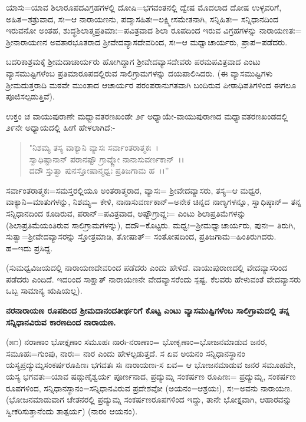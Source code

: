 ಯಾಸು=ಯಾವ ಶಿಲಾರೂಪದವಿಗ್ರಹಗಳಲ್ಲಿ ದೋಷಿ=ಭಗವಂತನಲ್ಲಿ ದ್ವೇಷ ಮೊದಲಾದ ದೋಷ ಉಳ್ಳವರಿಗೆ, ಅಹಿತ=ಶತ್ರುವಾದ, ಸಃ=ಆ ನಾರಾಯಣನು, ಪದ್ಮಾಸಹಿತಃ=ಲಕ್ಷ್ಮೀಸಮೇತನಾಗಿ, ಸನ್ನಿಹಿತಃ= ಸನ್ನಿಧಾನದಿಂದ ಇರುವನೋ ಅಂತಹ, ಶುದ್ಧಶಿಲಾತ್ಮಪ್ರತಿಮಾಃ=ಪವಿತ್ರವಾದ ಶಿಲಾ ರೂಪದಿಂದ ಇರುವ ವಿಗ್ರಹಗಳನ್ನು ನಾರಾಯಣತಃ= ಶ‍್ರೀನಾರಾಯಣನ ಅವತಾರಭೂತರಾದ ಶ‍್ರೀವೇದವ್ಯಾಸದೇವರಿಂದ, ಸಃ=ಆ ಮಧ್ವಾಚಾರ್ಯರು, ಪ್ರಾಪ=ಪಡೆದರು.

ಬದರಿಕಾಶ್ರಮಕ್ಕೆ ಶ‍್ರೀಮದಾಚಾರ್ಯರು ಹೋಗಿದ್ದಾಗ ಶ‍್ರೀವೇದವ್ಯಾಸದೇವರು ಪರಮಪವಿತ್ರವಾದ ಎಂಟು ವ್ಯಾಸಮುಷ್ಟಿಗಳೆಂಬ ಪ್ರತಿಮಾರೂಪದಲ್ಲಿರುವ ಸಾಲಿಗ್ರಾಮಗಳನ್ನು ದಯಪಾಲಿಸಿದರು. (ಈ ವ್ಯಾಸಮುಷ್ಟಿಗಳು ಶ‍್ರೀಮದುತ್ತರಾದಿ ಮಠವೇ ಮುಂತಾದ ಆಚಾರ್ಯರ ಪರಂಪರಾನುಗತವಾಗಿ ಬಂದಿರುವ ಪೀಠಾಧಿಪತಿಗಳಿಂದ ಈಗಲೂ ಪೂಜಿಸಲ್ಪಡುತ್ತಿವೆ).

ಉಕ್ತಂ ಚ ವಾಯುಪುರಾಣೇ ಮಧ್ವಾವತರಣಖಂಡೇ ೨೯ ಅಧ್ಯಾಯೇ-ವಾಯುಪುರಾಣದ ಮಧ್ಯಾವತರಣಖಂಡದಲ್ಲಿ ೨೯ನೇ ಅಧ್ಯಾಯದಲ್ಲಿ ಹೀಗೆ ಹೇಳಲಾಗಿದೆ:-

\begin{verse}
"ನಿಶಮ್ಯ ತಸ್ಯ ವಾಕ್ಯಾನಿ ವ್ಯಾಸಃ ಸರ್ವಾಂತರಾತ್ಮಕಃ~।\\ ಸ್ವಾಧಿಷ್ಟಾನಾನ್ ಪರಾನಷ್ಟೌ ಗ್ರಾವ್ಣೋ ನಾನಾಸುವರ್ಣಕಾನ್~।।\\ ದದೌ ಸ್ತುತ್ವಾ ಪುನಸ್ತೋಷಾನ್ಮಧ್ವಃ ಪ್ರತಿಜಗಾಮ ಹ~।।”
\end{verse}

ಸರ್ವಾಂತರಾತ್ಮಕಃ=ಸಮಸ್ತರಲ್ಲಿಯೂ ಅಂತರಾತ್ಮರಾದ, ವ್ಯಾಸಃ= ಶ‍್ರೀವೇದವ್ಯಾಸರು, ತಸ್ಯ=ಆ ಮಧ್ವರ, ವಾಕ್ಯಾನಿ=ಮಾತುಗಳನ್ನು, ನಿಶಮ್ಯ= ಕೇಳಿ, ನಾನಾಸುವರ್ಣಕಾನ್=ಅನೇಕ ಚಿನ್ನದ ನಾಣ್ಯಗಳನ್ನೂ, ಸ್ವಾಧಿಷ್ಠಾನ್= ತನ್ನ ಸನ್ನಿಧಾನದಿಂದ ಕೂಡಿರುವ, ಪರಾನ್=ಪವಿತ್ರವಾದ, ಅಷ್ಟೌಗ್ರಾವ್ಣಃ= ಎಂಟು ಶಿಲಾಪ್ರತಿಮೆಗಳನ್ನು (ಶಿಲಾಪ್ರತಿಮೆಯಂತಿರುವ ಸಾಲಿಗ್ರಾಮಗಳನ್ನು), ದದೌ=ಕೊಟ್ಟರು. ಮಧ್ವಃ=ಶ‍್ರೀಮಧ್ವಾಚಾರ್ಯರು, ಪುನಃ= ತಿರುಗಿ, ಸುತ್ವಾ=ಶ‍್ರೀವೇದವ್ಯಾಸರನ್ನು ಸ್ತೋತ್ರಮಾಡಿ, ತೋಷಾತ್= ಸಂತೋಷದಿಂದ, ಪ್ರತಿಜಗಾಮ=ಹಿಂತಿರುಗಿದರು. ಹ=ಇದು ಪ್ರಸಿದ್ದ.

(ಸುಮಧ್ವವಿಜಯದಲ್ಲಿ ನಾರಾಯಣದೇವರಿಂದ ಪಡೆದರು ಎಂದು ಹೇಳಿದೆ. ವಾಯುಪುರಾಣದಲ್ಲಿ ವೇದವ್ಯಾಸರಿಂದ ಪಡೆದರು ಎಂದಿದೆ. ಇದರಿಂದ ಸಾಕ್ಷಾತ್ ನಾರಾಯಣನೇ ವೇದವ್ಯಾಸರೆಂದು ಸ್ಪಷ್ಟ. ಕೆಲವರು ಹೇಳುವಂತೆ ವೇದವ್ಯಾಸರು ಒಬ್ಬ ಸಾಮಾನ್ಯ ಋಷಿಯಲ್ಲ).

\begin{center}
\textbf{ನರನಾರಾಯಣ ರೂಪದಿಂದ ಶ‍್ರೀಮದಾನಂದತೀರ್ಥರಿಗೆ ಕೊಟ್ಟ ಎಂಟು ವ್ಯಾಸಮುಷ್ಟಿಗಳೆಂಬ ಸಾಲಿಗ್ರಾಮದಲ್ಲಿ ತನ್ನ ಸನ್ನಿಧಾನವಿರುವ ಕಾರಣದಿಂದ ನಾರಾಯಣ.}
\end{center}

(೫೧) ನರಾಣಾಂ ಭೋಕ್ತೃಣಾಂ ಸಮೂಹಃ ನಾರಃ-ನರಾಣಾಂ= ಭೋಕೃಣಾಂ=ಭೋಜನಮಾಡುವ ಜನರ, ಸಮೂಹಃ=ಗುಂಪು, ನಾರಃ= ನಾರ ಎಂದು ಹೇಳಲ್ಪಡುತ್ತದೆ. ಸ ಏವ ಅಯನಂ ಸನ್ನಿಧಾನಸ್ಥಾನಂ ಯಸ್ಯಪ್ರದ್ಯುಮ್ನಸಂಕರ್ಷರೂಪಿಣಃ ಭಗವತಃ ಸಃ ನಾರಾಯಣಃ-ಸ ಏವ= ಆ ಭೋಜನಮಾಡುವ ಜನರ ಸಮೂಹವೇ, ಯಸ್ಯ ಭಗವತಃ=ಯಾವ ಷಡ್ಗುಣೈಶ್ವರ್ಯ ಪೂರ್ಣನಾದ, ಪ್ರದ್ಯುಮ್ನ ಸಂಕರ್ಷಣ ರೂಪಿಣಃ= ಪ್ರದ್ಯುಮ್ನ, ಸಂಕರ್ಷಣ ರೂಪಗಳಿಂದ, ಸನ್ನಿಧಾನಸ್ಥಾನಂ=ಸನ್ನಿಧಾನವಿರುವ ಪ್ರದೇಶವೋ (ಅಯನಂ=ಆಶ್ರಯಃ), ಸಃ=ಅವನು ನಾರಾಯಣ. (ಭೋಜನಮಾಡುವಾಗ ಚೇತನರಲ್ಲಿ ಪ್ರದ್ಯುಮ್ನ ಸಂಕರ್ಷಣರೂಪಗಳಿಂದ ಇದ್ದು, ತಾನೇ ಭೋಕ್ತೃವಾಗಿ, ಆಹಾರವನ್ನು ಸ್ವೀಕರಿಸುತ್ತಾನೆಂದು ತಾತ್ಪರ್ಯ) (ನಾರಂ ಆಯನಂ).

